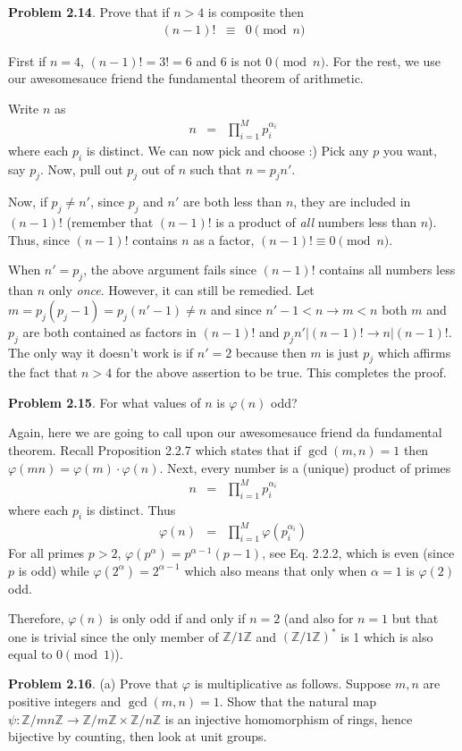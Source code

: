 \documentclass[aps,preprint,preprintnumbers,nofootinbib,showpacs,prd]{revtex4-1}
\newcommand{\nbea}{\begin{eqnarray*}}
\newcommand{\neea}{\end{eqnarray*}}
\begin{document}
{\bf Problem 2.14}. Prove that if $n > 4$ is composite then
%
\nbea
(n-1)! & \equiv & 0 \pmod{n}
\neea
%

First if $n=4$, $(n-1)! = 3! = 6$ and 6 is not $0 \pmod{n}$. For the rest, we use our awesomesauce friend the fundamental theorem of arithmetic.

Write $n$ as
%
\nbea
n & = & \prod_{i=1}^{M} p_i^{\alpha_i}
\neea
%
where each $p_i$ is distinct. We can now pick and choose :) Pick any $p$ you want, say $p_j$. Now, pull out $p_j$ out of $n$ such that $n = p_j n'$.

Now, if $p_j \neq n'$, since $p_j$ and $n'$ are both less than $n$, they are included in $(n-1)!$ (remember that $(n-1)!$ is a product of {\it all} numbers less than $n$). Thus, since $(n-1)!$ contains $n$ as a factor, $(n-1)! \equiv 0 \pmod{n}$.

When $n' = p_j$, the above argument fails since $(n-1)!$ contains all numbers less than $n$ only {\it once}. However, it can still be remedied. Let $m=p_j(p_j-1) = p_j(n'-1) \neq n$ and since $n'-1<n \to m < n$ both $m$ and $p_j$ are both contained as factors in $(n-1)!$ and $p_j n'|(n-1)! \to n | (n-1)!$. The only way it doesn't work is if $n'=2$ because then $m$ is just $p_j$ which affirms the fact that $n > 4$ for the above assertion to be true. This completes the proof.

{\bf Problem 2.15}. For what values of $n$ is $\varphi(n)$ odd?

Again, here we are going to call upon our awesomesauce friend da fundamental theorem. Recall Proposition 2.2.7 which states that if $\gcd(m,n)=1$ then $\varphi(mn) = \varphi(m) \cdot \varphi(n)$. Next, every number is a (unique) product of primes
%
\nbea
n & = & \prod_{i=1}^{M} p_i^{\alpha_i}
\neea
%
where each $p_i$ is distinct. Thus
%
\nbea
\varphi(n) & = & \prod_{i=1}^{M} \varphi(p_i^{\alpha_i})
\neea
%
For all primes $p > 2$, $\varphi(p^\alpha) = p^{\alpha-1}(p-1)$, see Eq. 2.2.2, which is even (since $p$ is odd) while $\varphi(2^\alpha) = 2^{\alpha-1}$ which also means that only when $\alpha=1$ is $\varphi(2)$ odd.

Therefore, $\varphi(n)$ is only odd if and only if $n=2$ (and also for $n=1$ but that one is trivial since the only member of $\mathbb{Z}/1\mathbb{Z}$ and $(\mathbb{Z}/1\mathbb{Z})^*$ is 1 which is also equal to $0 \pmod{1}$).

{\bf Problem 2.16}.  (a) Prove that $\varphi$ is multiplicative as follows. Suppose $m, n$ are positive integers and $\gcd(m, n) = 1$. Show that the natural map $\psi : \mathbb{Z}/mn\mathbb{Z} \to \mathbb{Z}/m\mathbb{Z} \times \mathbb{Z}/n\mathbb{Z}$ is an injective homomorphism of rings, hence bijective by counting, then look at unit groups.
\end{document}
